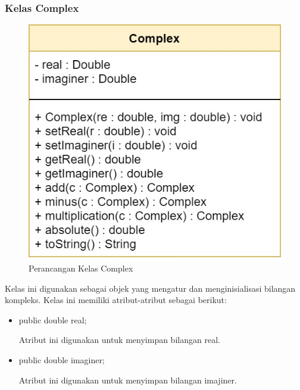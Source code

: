 \subsubsection{Kelas Complex}
\begin{figure}[H] 
	\centering  
	\includegraphics[scale=0.35]{Gambar/Controller Package/Controller-complex.jpg}
	\caption[Perancangan Kelas Complex]{Perancangan Kelas Complex}
	\label{fig:controller_complex} 
\end{figure}
Kelas ini digunakan sebagai objek yang mengatur dan menginisialisasi bilangan kompleks. Kelas ini memiliki atribut-atribut sebagai berikut:
\begin{itemize}
    \item public double real;
    
    Atribut ini digunakan untuk menyimpan bilangan real.
    
    \item public double imaginer;
    
    Atribut ini digunakan untuk menyimpan bilangan imajiner.
\end{itemize}

